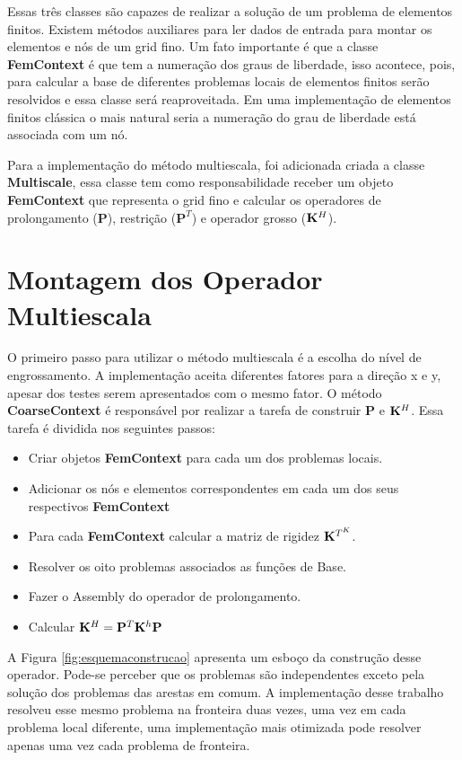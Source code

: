 Essas três classes são capazes de realizar a solução de um problema de elementos finitos. Existem métodos auxiliares para ler dados de entrada para montar os elementos e nós de um grid fino. Um fato importante é que a classe \textbf{FemContext} é que tem a numeração dos graus de liberdade, isso acontece, pois, para calcular a base de diferentes problemas locais de elementos finitos serão resolvidos e essa classe será reaproveitada. Em uma implementação de elementos finitos clássica o mais natural seria a numeração do grau de liberdade está associada com um nó.


Para a implementação do método multiescala, foi adicionada criada a classe \textbf{Multiscale}, essa classe tem como responsabilidade receber um objeto \textbf{FemContext} que representa o grid fino e calcular os operadores de prolongamento ($\mathbf{P}$), restrição ($\mathbf{P}^T$) e operador grosso ($\mathbf{K}^H$).


\section{Montagem dos Operador Multiescala}

O primeiro passo para utilizar o método multiescala é a escolha do nível de engrossamento. A implementação aceita diferentes fatores para a direção x e y, apesar dos testes serem apresentados com o mesmo fator. O método \textbf{CoarseContext} é responsável por realizar a tarefa de construir $\mathbf{P}$ e $\mathbf{K}^H$. Essa tarefa é dividida nos seguintes passos: 

\begin{itemize}
    \item Criar objetos \textbf{FemContext} para cada um dos problemas locais.
    \item Adicionar os nós e elementos correspondentes em cada um dos seus respectivos \textbf{FemContext}
    \item Para cada \textbf{FemContext} calcular a matriz de rigidez $\mathbf{K}^{T^K}$.
    \item Resolver os oito problemas associados as funções de Base.
    \item Fazer o Assembly do operador de prolongamento.
    \item Calcular $\mathbf{K}^H = \mathbf{P}^T \mathbf{K}^h \mathbf{P}$
\end{itemize}

A Figura \ref{fig:esquemaconstrucao} apresenta um esboço da construção desse operador. Pode-se perceber que os problemas são independentes exceto pela solução dos problemas das arestas em comum. A implementação desse trabalho resolveu esse mesmo problema na fronteira duas vezes, uma vez em cada problema local diferente, uma implementação mais otimizada pode resolver apenas uma vez cada problema de fronteira.

